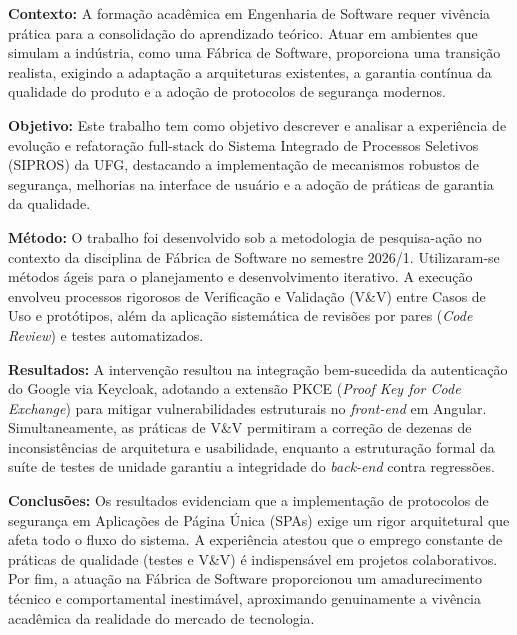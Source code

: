 
\begin{resumo} 

\textbf{Contexto:}
A formação acadêmica em Engenharia de Software requer vivência prática para a consolidação do aprendizado teórico. Atuar em ambientes que simulam a indústria, como uma Fábrica de Software, proporciona uma transição realista, exigindo a adaptação a arquiteturas existentes, a garantia contínua da qualidade do produto e a adoção de protocolos de segurança modernos.

\textbf{Objetivo:}
Este trabalho tem como objetivo descrever e analisar a experiência de evolução e refatoração full-stack do Sistema Integrado de Processos Seletivos (SIPROS) da UFG, destacando a implementação de mecanismos robustos de segurança, melhorias na interface de usuário e a adoção de práticas de garantia da qualidade.

\textbf{Método:}
O trabalho foi desenvolvido sob a metodologia de pesquisa-ação no contexto da disciplina de Fábrica de Software no semestre 2026/1. Utilizaram-se métodos ágeis para o planejamento e desenvolvimento iterativo. A execução envolveu processos rigorosos de Verificação e Validação (V\&V) entre Casos de Uso e protótipos, além da aplicação sistemática de revisões por pares (\textit{Code Review}) e testes automatizados.

\textbf{Resultados:}
A intervenção resultou na integração bem-sucedida da autenticação do Google via Keycloak, adotando a extensão PKCE (\textit{Proof Key for Code Exchange}) para mitigar vulnerabilidades estruturais no \textit{front-end} em Angular. Simultaneamente, as práticas de V\&V permitiram a correção de dezenas de inconsistências de arquitetura e usabilidade, enquanto a estruturação formal da suíte de testes de unidade garantiu a integridade do \textit{back-end} contra regressões.

\textbf{Conclusões:}
Os resultados evidenciam que a implementação de protocolos de segurança em Aplicações de Página Única (SPAs) exige um rigor arquitetural que afeta todo o fluxo do sistema. A experiência atestou que o emprego constante de práticas de qualidade (testes e V\&V) é indispensável em projetos colaborativos. Por fim, a atuação na Fábrica de Software proporcionou um amadurecimento técnico e comportamental inestimável, aproximando genuinamente a vivência acadêmica da realidade do mercado de tecnologia.

\end{resumo}
